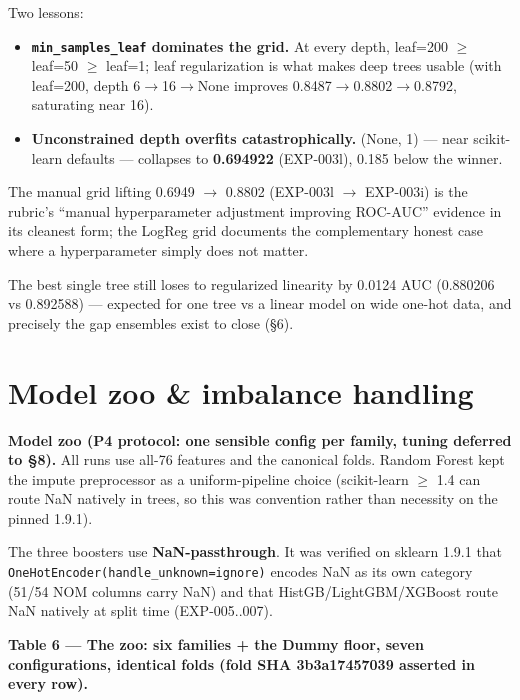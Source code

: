 \documentclass[11pt,a4paper]{article}
\providecommand{\tightlist}{\setlength{\itemsep}{2pt}\setlength{\parskip}{0pt}}
\begin{document}
Two lessons:

\begin{itemize}
\tightlist
\item
  \textbf{\texttt{min\_samples\_leaf} dominates the grid.} At every
  depth, leaf=200 $\ge$ leaf=50 $\ge$ leaf=1; leaf regularization is what makes
  deep trees usable (with leaf=200, depth 6$\rightarrow$16$\rightarrow$None improves
  0.8487$\rightarrow$0.8802$\rightarrow$0.8792, saturating near 16).
\item
  \textbf{Unconstrained depth overfits catastrophically.} (None, 1) ---
  near scikit-learn defaults --- collapses to \textbf{0.694922}
  (EXP-003l), 0.185 below the winner.
\end{itemize}

The manual grid lifting 0.6949 $\rightarrow$ 0.8802 (EXP-003l $\rightarrow$ EXP-003i) is the
rubric's ``manual hyperparameter adjustment improving ROC-AUC'' evidence
in its cleanest form; the LogReg grid documents the complementary honest
case where a hyperparameter simply does not matter.

The best single tree still loses to regularized linearity by 0.0124 AUC
(0.880206 vs 0.892588) --- expected for one tree vs a linear model on
wide one-hot data, and precisely the gap ensembles exist to close (\S{}6).

\section{Model zoo \& imbalance
handling}\label{model-zoo-imbalance-handling}

\textbf{Model zoo (P4 protocol: one sensible config per family, tuning
deferred to \S{}8).} All runs use all-76 features and the canonical folds.
Random Forest kept the impute preprocessor as a uniform-pipeline choice
(scikit-learn $\ge$ 1.4 can route NaN natively in trees, so this was
convention rather than necessity on the pinned 1.9.1).

The three boosters use \textbf{NaN-passthrough}. It was verified on
sklearn 1.9.1 that
\texttt{OneHotEncoder(handle\_unknown=\textquotesingle{}ignore\textquotesingle{})}
encodes NaN as its own category (51/54 NOM columns carry NaN) and that
HistGB/LightGBM/XGBoost route NaN natively at split time (EXP-005..007).

\textbf{Table 6 --- The zoo: six families + the Dummy floor, seven
configurations, identical folds (fold SHA 3b3a17457039 asserted in every
row).}
\end{document}

